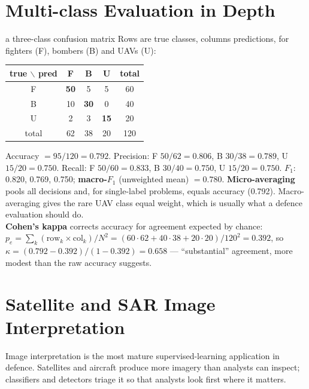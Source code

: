 \documentclass[11pt]{article}
\begin{document}
\section{Multi-class Evaluation in Depth}
\begin{example}{a three-class confusion matrix}
Rows are true classes, columns predictions, for fighters (F), bombers (B) and UAVs (U):
\begin{center}\small\begin{tabular}{c|ccc|c}\toprule true $\backslash$ pred & F & B & U & total\\\midrule F & \textbf{50} & 5 & 5 & 60\\ B & 10 & \textbf{30} & 0 & 40\\ U & 2 & 3 & \textbf{15} & 20\\\midrule total & 62 & 38 & 20 & 120\\\bottomrule\end{tabular}\end{center}
Accuracy $=95/120=0.792$. Precision: F $50/62=0.806$, B $30/38=0.789$, U $15/20=0.750$. Recall: F $50/60=0.833$, B $30/40=0.750$, U $15/20=0.750$. $F_1$: 0.820, 0.769, 0.750; \textbf{macro-$F_1$} (unweighted mean) $=0.780$. \textbf{Micro-averaging} pools all decisions and, for single-label problems, equals accuracy (0.792). Macro-averaging gives the rare UAV class equal weight, which is usually what a defence evaluation should do.\\[3pt]
\textbf{Cohen's kappa} corrects accuracy for agreement expected by chance: $p_e=\sum_k(\text{row}_k\times\text{col}_k)/N^2=(60\cdot62+40\cdot38+20\cdot20)/120^2=0.392$, so $\kappa=(0.792-0.392)/(1-0.392)=0.658$ --- ``substantial'' agreement, more modest than the raw accuracy suggests.
\end{example}

\section{Satellite and SAR Image Interpretation}
Image interpretation is the most mature supervised-learning application in defence. Satellites and aircraft produce more imagery than analysts can inspect; classifiers and detectors triage it so that analysts look first where it matters.
\end{document}
